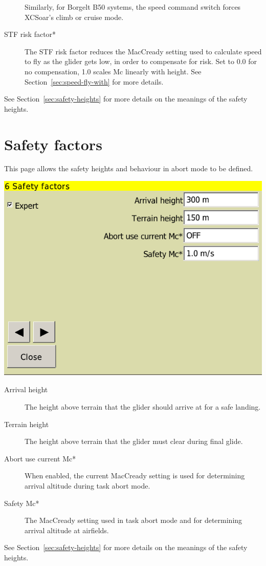 \documentclass[a4paper,12pt]{refrep}
\begin{document}
\begin{description}
  Similarly, for Borgelt B50 systems, the speed command switch forces
  XCSoar's climb or cruise mode.

\item[STF risk factor*] 
  The STF risk factor reduces the MacCready setting used to calculate
  speed to fly as the glider gets low, in order to compensate for
  risk.  Set to 0.0 for no compensation, 1.0 scales Mc linearly with
  height.  See Section~\ref{sec:speed-fly-with} for more details.
\end{description}
See Section~\ref{sec:safety-heights} for more details on the meanings
of the safety heights.

\section{Safety factors}

This page allows the safety heights and behaviour in abort mode to be defined.

\begin{center}
\includegraphics[angle=0,width=\linewidth,keepaspectratio='true']{figures/config-4.png}
\end{center}

\begin{description}
\item[Arrival height]  The height above terrain that the glider
  should arrive at for a safe landing.
\item[Terrain height] The height above terrain that the glider must
  clear during final glide.
\item[Abort use current Mc*]  When enabled, the current MacCready setting
  is used for determining arrival altitude during task abort mode.
\item[Safety Mc*]  The MacCready setting used in task abort mode and
  for determining arrival altitude at airfields. 
\end{description}
See Section~\ref{sec:safety-heights} for more details on the meanings
of the safety heights.
\end{document}
